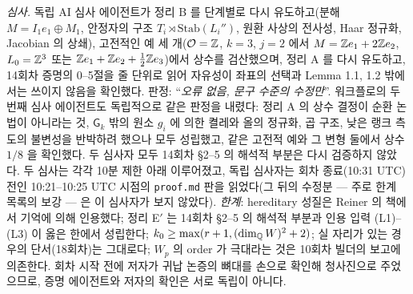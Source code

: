 \noindent\emph{심사.} 독립 AI 심사 에이전트가 정리 B 를 단계별로 다시 유도하고(분해 $M=I_1e_1\oplus M_1$, 안정자의 구조 $T_i\rtimes\mathrm{Stab}(L_i'')$, 원환 사상의 전사성, Haar 정규화, Jacobian 의 상쇄), 고전적인 예 세 개($\mathcal O=\mathbb{Z}$, $k=3$, $j=2$ 에서 $M=\mathbb{Z} e_1+2\mathbb{Z} e_2$, $L_0=\mathbb{Z}^3$ 또는 $\mathbb{Z} e_1+\mathbb{Z} e_2+\tfrac12\mathbb{Z} e_3$)에서 상수를 검산했으며, 정리 A 를 다시 유도하고, 14회차 증명의 0--5절을 줄 단위로 읽어 자유성이 좌표의 선택과 Lemma 1.1, 1.2 밖에서는 쓰이지 않음을 확인했다. 판정: ``\emph{오류 없음, 문구 수준의 수정만}''. 워크플로의 두 번째 심사 에이전트도 독립적으로 같은 판정을 내렸다: 정리 A 의 상수 결정이 순환 논법이 아니라는 것, $\mathsf G_k$ 밖의 원소 $g_i$ 에 의한 켤레와 올의 정규화, 곱 구조, 낮은 랭크 측도의 불변성을 반박하려 했으나 모두 성립했고, 같은 고전적 예와 그 변형 둘에서 상수 $1/8$ 을 확인했다. 두 심사자 모두 14회차 \S2--5 의 해석적 부분은 다시 검증하지 않았다. 두 심사는 각각 10분 제한 아래 이루어졌고, 독립 심사자는 회차 종료(10:31 UTC) 전인 10:21--10:25 UTC 시점의 \texttt{proof.md} 판을 읽었다(그 뒤의 수정분 --- 주로 한계 목록의 보강 --- 은 이 심사자가 보지 않았다). \emph{한계}: hereditary 성질은 Reiner 의 책에서 기억에 의해 인용했다; 정리 E$'$ 는 14회차 \S2--5 의 해석적 부분과 인용 입력 (L1)--(L3) 이 옳은 한에서 성립한다; $k_0\ge\max(r+1,(\dim_{\mathbb{Q}} W)^2+2)$; 실 자리가 있는 경우의 단서(18회차)는 그대로다; $W_p$ 의 order 가 극대라는 것은 10회차 빌더의 보고에 의존한다. 회차 시작 전에 저자가 귀납 논증의 뼈대를 손으로 확인해 청사진으로 주었으므로, 증명 에이전트와 저자의 확인은 서로 독립이 아니다.

